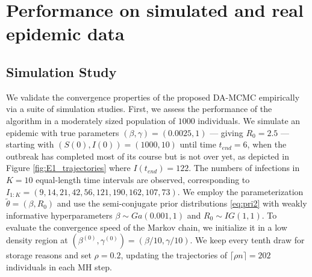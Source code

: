 \documentclass[12pt]{article}
\begin{document}
	
	\section{Performance on simulated and real epidemic data}
	\label{sec:per}
	
	\subsection{Simulation Study}
	\label{sec:sim}
	
	We validate the convergence properties of the proposed DA-MCMC empirically via a suite of simulation studies. First, we assess the performance of the algorithm in a moderately sized population of $1000$ individuals. We simulate an epidemic with true parameters $(\beta, \gamma) = (0.0025, 1)$ --- giving $R_0 = 2.5$ --- starting with $(S(0), I(0)) = (1000, 10)$ until time $t_{end} = 6$, when the outbreak has completed most of its course but is not over yet, as depicted in Figure \ref{fig:E1_trajectories} where $I(t_{end}) = 122$. The numbers of infections in $K = 10$ equal-length time intervals are observed, corresponding to $I_{1:K} = (9, 14, 21, 42, 56, 121, 190, 162, 107, 73)$.	
	We employ the parameterization $\tilde{\theta} = (\beta, R_0)$ and use the semi-conjugate prior distributions \eqref{eq:pri2} with weakly informative hyperparameters $\beta \sim Ga(0.001, 1)$ and $R_0 \sim IG(1,1)$.
	To evaluate the convergence speed of the Markov chain, we initialize it in a low density region at $\left(\beta^{(0)}, \gamma^{(0)}\right) = \left(\beta/10, \gamma/10\right)$. We keep every tenth draw for storage reasons and set $\rho = 0.2$, updating the trajectories of $\lceil\rho n\rceil = 202$ individuals in each MH step.
	
\end{document}

